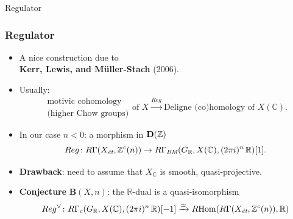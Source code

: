 \documentclass[handout]{beamer}
\newcommand{\personality}[1]{{\bf #1}}
\newcommand{\ZZ}{\mathbb{Z}}
\newcommand{\RR}{\mathbb{R}}
\newcommand{\CC}{\mathbb{C}}
\DeclareMathOperator{\Hom}{Hom}
\newcommand{\RHom}{R\!\Hom}
\newcommand{\categ}[1]{\text{\bf #1}}
\newcommand{\quiso}{\simeq}
\begin{document}

\begin{frame}[plain]
  \headingfont

  \vspace{\fill}

  \begin{center}
    {\huge Regulator}
  \end{center}

  \vspace{\fill}
\end{frame}


\begin{frame}
  \frametitle{Regulator}

  \begin{itemize}
  \item<2-> A nice construction due to\\
    \personality{Kerr, Lewis, and Müller-Stach} (2006).

  \item<3-> Usually:
    $$\begin{array}{c}
        \text{motivic cohomology}\\
        \text{(higher Chow groups)}
      \end{array}\text{of }X \xrightarrow{Reg} \text{Deligne (co)homology of }X(\CC).$$

  \item<4-> In our case $n < 0$: a morphism in $\categ{D} (\ZZ)$
    $$Reg\colon R\Gamma(X_\text{\it ét},\ZZ^c (n)) \to
    R\Gamma_\text{\it BM} (G_\RR,X(\CC),(2\pi i)^n\,\RR)[1].$$

  \item<5-> \textbf{Drawback}: need to assume that $X_\CC$ is smooth,
    quasi-projective.

  \item<6-> \textbf{Conjecture} $\mathbf{B}(X, n)$: the $\RR$-dual is a
    quasi-isomorphism
    $$Reg^\vee\colon R\Gamma_c (G_\RR, X(\CC), (2\pi i)^n\,\RR)[-1] \xrightarrow{\quiso}
    \RHom(R\Gamma(X_\text{\it ét}, \ZZ^c (n)), \RR)$$
  \end{itemize}
\end{frame}

\end{document}

